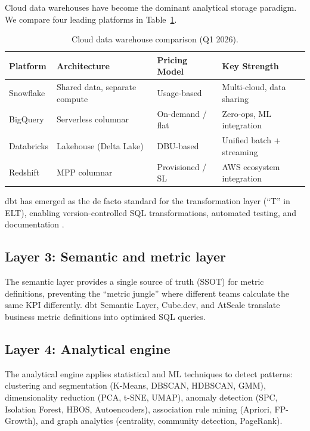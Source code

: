 \documentclass[preprint,12pt,authoryear]{elsarticle}
\theoremstyle{definition}
\begin{document}
Cloud data warehouses have become the dominant analytical storage paradigm. We compare four leading platforms in Table~\ref{tab:warehouses}.

\begin{table}[ht]
\centering
\caption{Cloud data warehouse comparison (Q1 2026).}
\label{tab:warehouses}
\begin{tabular}{llll}
\toprule
\textbf{Platform} & \textbf{Architecture} & \textbf{Pricing Model} & \textbf{Key Strength} \\
\midrule
Snowflake     & Shared data, separate compute & Usage-based       & Multi-cloud, data sharing \\
BigQuery      & Serverless columnar            & On-demand / flat  & Zero-ops, ML integration \\
Databricks    & Lakehouse (Delta Lake)         & DBU-based         & Unified batch + streaming \\
Redshift      & MPP columnar                   & Provisioned / SL  & AWS ecosystem integration \\
\bottomrule
\end{tabular}
\end{table}

dbt has emerged as the de facto standard for the transformation layer (``T'' in ELT), enabling version-controlled SQL transformations, automated testing, and documentation \citep{dbt2024}.

\subsection{Layer 3: Semantic and metric layer}

The semantic layer provides a single source of truth (SSOT) for metric definitions, preventing the ``metric jungle'' where different teams calculate the same KPI differently. dbt Semantic Layer, Cube.dev, and AtScale translate business metric definitions into optimised SQL queries.

\subsection{Layer 4: Analytical engine}

The analytical engine applies statistical and ML techniques to detect patterns: clustering and segmentation (K-Means, DBSCAN, HDBSCAN, GMM), dimensionality reduction (PCA, t-SNE, UMAP), anomaly detection (SPC, Isolation Forest, HBOS, Autoencoders), association rule mining (Apriori, FP-Growth), and graph analytics (centrality, community detection, PageRank).
\end{document}
